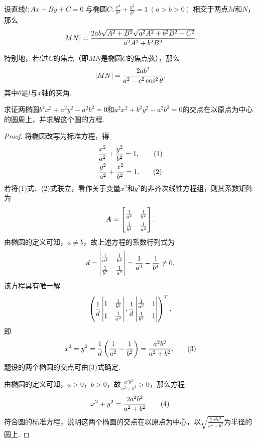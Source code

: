 \begin{theorem}[椭圆的弦长]
设直线\(l: Ax+By+C=0\)
与椭圆\(C: \frac{x^2}{a^2} + \frac{y^2}{b^2} = 1\ (a>b>0)\)
相交于两点\(M\)和\(N\)，那么
\begin{equation}
\abs{MN} = \frac{2ab\sqrt{A^2+B^2}\sqrt{a^2 A^2 + b^2 B^2 - C^2}}{a^2 A^2 + b^2 B^2}.
\end{equation}

特别地，若\(l\)过\(C\)的焦点（即\(MN\)是椭圆\(C\)的焦点弦），那么
\begin{equation}
\abs{MN} = \frac{2ab^2}{a^2 - c^2 \cos^2\theta},
\end{equation}
其中\(\theta\)是\(l\)与\(x\)轴的夹角.
\end{theorem}


\begin{example}
求证两椭圆\(b^2 x^2 + a^2 y^2 - a^2 b^2 = 0\)和\(a^2 x^2 + b^2 y^2 - a^2 b^2 = 0\)的交点在以原点为中心的圆周上，并求解这个圆的方程.
\begin{proof}
将椭圆改写为标准方程，得\begin{gather}
\frac{x^2}{a^2}+\frac{y^2}{b^2}=1, \tag1 \\
\frac{y^2}{a^2}+\frac{x^2}{b^2}=1. \tag2
\end{gather}
若将(1)式、(2)式联立，看作关于变量\(x^2\)和\(y^2\)的非齐次线性方程组，则其系数矩阵为\[
\mat{A} = \def\arraystretch{1.5} \begin{bmatrix}
\frac{1}{a^2} & \frac{1}{b^2} \\
\frac{1}{b^2} & \frac{1}{a^2}
\end{bmatrix}.
\]由椭圆的定义可知，\(a \neq b\)，故上述方程的系数行列式为\[
d = \def\arraystretch{1.5} \begin{vmatrix}
\frac{1}{a^2} & \frac{1}{b^2} \\
\frac{1}{b^2} & \frac{1}{a^2}
\end{vmatrix} = \frac{1}{a^4} - \frac{1}{b^4} \neq 0,
\]该方程具有唯一解\[
\left( \def\arraystretch{1.5}
\frac{1}{d} \begin{vmatrix}
1 & \frac{1}{b^2} \\
1 & \frac{1}{a^2}
\end{vmatrix},
\frac{1}{d} \begin{vmatrix}
\frac{1}{a^2} & 1 \\
\frac{1}{b^2} & 1
\end{vmatrix}
\right)^T,
\]即\begin{gather}
x^2 = y^2 = \frac{1}{d} \left(\frac{1}{a^2} - \frac{1}{b^2}\right)
= \frac{a^2 b^2}{a^2 + b^2}. \tag3
\end{gather}题设的两个椭圆的交点可由(3)式确定.

由椭圆的定义可知，\(a>0\)，\(b>0\)，故\(\frac{a^2 b^2}{a^2 + b^2} > 0\)，那么方程\begin{gather}
x^2 + y^2 = \frac{2 a^2 b^2}{a^2 + b^2} \tag4
\end{gather}符合圆的标准方程，说明这两个椭圆的交点在以原点为中心，以\(\sqrt{\frac{2 a^2 b^2}{a^2 + b^2}}\)为半径的圆上.
\end{proof}
\end{example}


